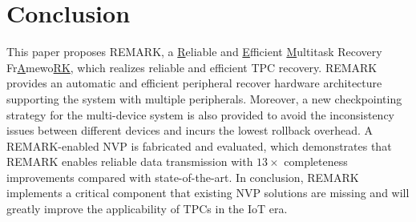 %
\section{Conclusion} \label{sec:conclution}
%
This paper proposes REMARK, a \underline{R}eliable and \underline{E}fficient \underline{M}ultitask Recovery Fr\underline{A}mewo\underline{RK}, which realizes reliable and efficient TPC recovery.
REMARK provides an automatic and efficient peripheral recover hardware architecture supporting the system with multiple peripherals.
Moreover, a new checkpointing strategy for the multi-device system is also provided to avoid the inconsistency issues between different devices and incurs the lowest rollback overhead.
A REMARK-enabled NVP is fabricated and evaluated, which demonstrates that REMARK enables reliable data transmission with $13\times$ completeness improvements compared with state-of-the-art. 
In conclusion, REMARK implements a critical component that existing NVP solutions are missing and will greatly improve the applicability of TPCs in the IoT era.


% 